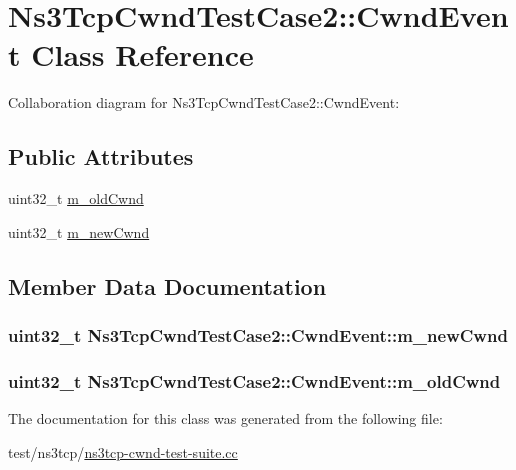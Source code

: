\hypertarget{classNs3TcpCwndTestCase2_1_1CwndEvent}{}\section{Ns3\+Tcp\+Cwnd\+Test\+Case2\+:\+:Cwnd\+Event Class Reference}
\label{classNs3TcpCwndTestCase2_1_1CwndEvent}


Collaboration diagram for Ns3\+Tcp\+Cwnd\+Test\+Case2\+:\+:Cwnd\+Event\+:
\subsection*{Public Attributes}
\begin{DoxyCompactItemize}
\item 
uint32\+\_\+t \hyperlink{classNs3TcpCwndTestCase2_1_1CwndEvent_afc684ab42e2a2a911931d4dfeb301fad}{m\+\_\+old\+Cwnd}
\item 
uint32\+\_\+t \hyperlink{classNs3TcpCwndTestCase2_1_1CwndEvent_a831770d295be9318f318f3f48b448469}{m\+\_\+new\+Cwnd}
\end{DoxyCompactItemize}


\subsection{Member Data Documentation}
\subsubsection[{\texorpdfstring{m\+\_\+new\+Cwnd}{m_newCwnd}}]{\setlength{\rightskip}{0pt plus 5cm}uint32\+\_\+t Ns3\+Tcp\+Cwnd\+Test\+Case2\+::\+Cwnd\+Event\+::m\+\_\+new\+Cwnd}\hypertarget{classNs3TcpCwndTestCase2_1_1CwndEvent_a831770d295be9318f318f3f48b448469}{}\label{classNs3TcpCwndTestCase2_1_1CwndEvent_a831770d295be9318f318f3f48b448469}
\subsubsection[{\texorpdfstring{m\+\_\+old\+Cwnd}{m_oldCwnd}}]{\setlength{\rightskip}{0pt plus 5cm}uint32\+\_\+t Ns3\+Tcp\+Cwnd\+Test\+Case2\+::\+Cwnd\+Event\+::m\+\_\+old\+Cwnd}\hypertarget{classNs3TcpCwndTestCase2_1_1CwndEvent_afc684ab42e2a2a911931d4dfeb301fad}{}\label{classNs3TcpCwndTestCase2_1_1CwndEvent_afc684ab42e2a2a911931d4dfeb301fad}


The documentation for this class was generated from the following file\+:\begin{DoxyCompactItemize}
\item 
test/ns3tcp/\hyperlink{ns3tcp-cwnd-test-suite_8cc}{ns3tcp-\/cwnd-\/test-\/suite.\+cc}\end{DoxyCompactItemize}
